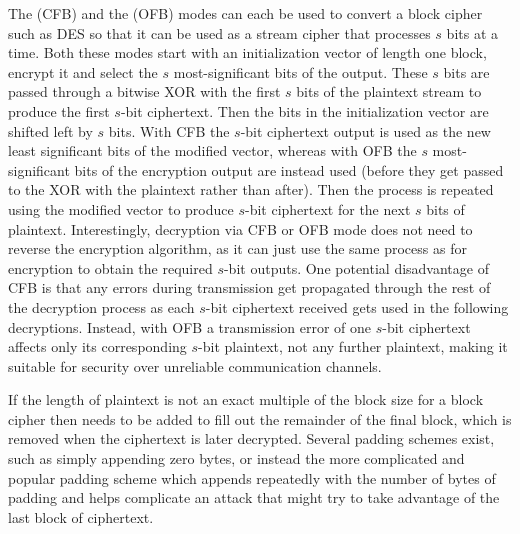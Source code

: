 The  (CFB) and the 
(OFB) modes can each be used to convert a block cipher such as DES so
that it can be used as a stream cipher that processes $s$ bits at a time.
Both these modes start with an initialization vector of length one block,
encrypt it and select the $s$ most-significant bits of the output.
These $s$ bits are passed through a bitwise XOR with the first $s$ bits
of the plaintext stream to produce the first $s$-bit ciphertext. Then the
bits in the initialization vector are shifted left by $s$ bits.
With CFB the $s$-bit ciphertext output is used as the new least significant bits
of the modified vector, whereas with OFB the $s$ most-significant bits of the
encryption output are instead used (before they get passed to the XOR with the plaintext
rather than after).
Then the process is repeated using the modified vector to
produce $s$-bit ciphertext for the next $s$ bits of plaintext.
Interestingly, decryption via CFB or OFB mode does not need to reverse the
encryption algorithm, as it can just use the same process as for encryption to obtain the
required $s$-bit outputs.
One potential disadvantage of CFB is that any errors during transmission
get propagated through the rest of the decryption process as each $s$-bit
ciphertext received gets used in the following decryptions.
Instead, with OFB a transmission error
of one $s$-bit ciphertext affects only its corresponding $s$-bit plaintext,
not any further plaintext, making it suitable for security over unreliable
communication channels.

If the length of plaintext is not an exact multiple of the block size
for a block cipher then  needs to be added
to fill out the remainder of the final block, which is removed when the
ciphertext is later decrypted.
Several padding schemes exist, such as simply appending zero bytes,
or instead the more complicated and popular padding scheme 
which appends repeatedly with the number of bytes of padding
and helps complicate an attack that might try to
take advantage of the last block of ciphertext.

